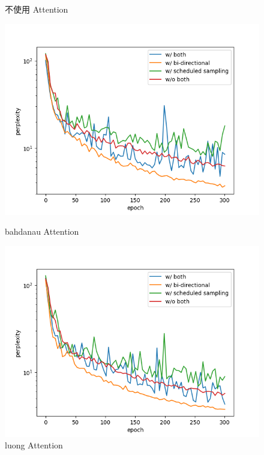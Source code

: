 \documentclass[12pt, a4paper]{article}
\theoremstyle{mystyle}	%
\begin{document}
\begin{enumerate}
\begin{figure}[!htb]
    \caption{不使用 Attention}
    \label{fig:at0}
   \endminipage
   \hfill
    \includegraphics[scale=0.5]{at1.png}
    \caption{bahdanau Attention}
    \label{fig:at1}
   \endminipage
   \hfill
    \includegraphics[scale=0.5]{at2.png}
    \caption{luong Attention}
    \label{fig:at2}
   \endminipage
  \end{figure}
\end{enumerate}
\end{document}
